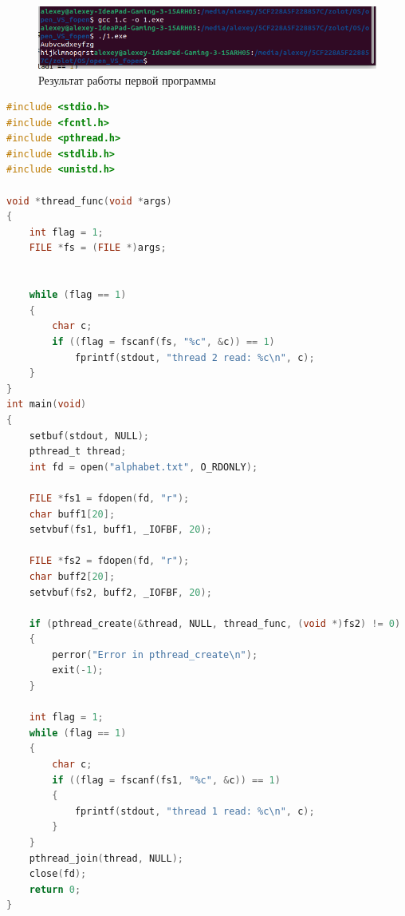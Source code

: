 \documentclass[12pt]{report}
\begin{document}
\begin{figure}[H]
	\centering
	\includegraphics[scale=0.66]{1out.png}
	\caption{Результат работы первой программы}
	\label{fig:prog_01}
\end{figure}

\begin{lstlisting}[language=c, label=p1thread, caption=Первая программа (реализация с потоками)]
#include <stdio.h>
#include <fcntl.h>
#include <pthread.h>
#include <stdlib.h>
#include <unistd.h>

void *thread_func(void *args)
{
    int flag = 1;
    FILE *fs = (FILE *)args;


    while (flag == 1)
    {
        char c;
        if ((flag = fscanf(fs, "%c", &c)) == 1)
            fprintf(stdout, "thread 2 read: %c\n", c);
    }
}
int main(void)
{
    setbuf(stdout, NULL);
    pthread_t thread;
    int fd = open("alphabet.txt", O_RDONLY);

    FILE *fs1 = fdopen(fd, "r");
    char buff1[20];
    setvbuf(fs1, buff1, _IOFBF, 20);

    FILE *fs2 = fdopen(fd, "r");
    char buff2[20];
    setvbuf(fs2, buff2, _IOFBF, 20);

    if (pthread_create(&thread, NULL, thread_func, (void *)fs2) != 0)
	{
		perror("Error in pthread_create\n");
		exit(-1);
	}
	
    int flag = 1;
    while (flag == 1)
    {
        char c;
        if ((flag = fscanf(fs1, "%c", &c)) == 1)
        {
            fprintf(stdout, "thread 1 read: %c\n", c);
        }
    }
    pthread_join(thread, NULL);
    close(fd);
    return 0;
}
\end{lstlisting}
\end{document}
